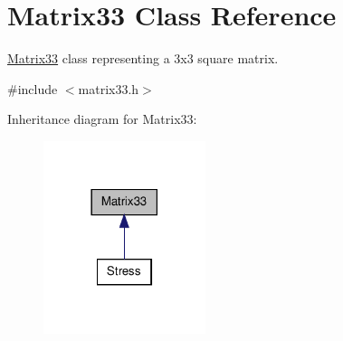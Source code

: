 \hypertarget{classMatrix33}{\section{\-Matrix33 \-Class \-Reference}
\label{de/d82/classMatrix33}
}


\hyperlink{classMatrix33}{\-Matrix33} class representing a 3x3 square matrix.  




{\ttfamily \#include $<$matrix33.\-h$>$}



\-Inheritance diagram for \-Matrix33\-:
\nopagebreak
\begin{figure}[H]
\begin{center}
\leavevmode
\includegraphics[width=134pt]{dc/dfe/classMatrix33__inherit__graph}
\end{center}
\end{figure}
